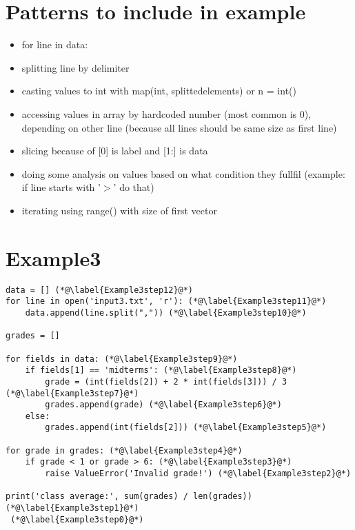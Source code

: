 \documentclass[11pt]{article}
\begin{document}
\section{Patterns to include in example}

\begin{itemize}

\item for line in data:

\item splitting line by delimiter

\item casting values to int with map(int, splittedelements) or n = int()

\item accessing values in array by hardcoded number (most common is 0), depending on other line (because all lines should be same size as first line)

\item slicing because of [0] is label and [1:] is data

\item doing some analysis on values based on what condition they fullfil (example: if line starts with '$>$' do that)

\item iterating using range() with size of first vector

\end{itemize}


\section{Example3}

\begin{lstlisting}
data = [] (*@\label{Example3step12}@*) 
for line in open('input3.txt', 'r'): (*@\label{Example3step11}@*) 
    data.append(line.split(",")) (*@\label{Example3step10}@*) 

grades = []

for fields in data: (*@\label{Example3step9}@*) 
    if fields[1] == 'midterms': (*@\label{Example3step8}@*) 
        grade = (int(fields[2]) + 2 * int(fields[3])) / 3 (*@\label{Example3step7}@*) 
        grades.append(grade) (*@\label{Example3step6}@*) 
    else:
        grades.append(int(fields[2])) (*@\label{Example3step5}@*) 

for grade in grades: (*@\label{Example3step4}@*) 
    if grade < 1 or grade > 6: (*@\label{Example3step3}@*) 
        raise ValueError('Invalid grade!') (*@\label{Example3step2}@*) 

print('class average:', sum(grades) / len(grades)) (*@\label{Example3step1}@*) 
 (*@\label{Example3step0}@*) 
\end{lstlisting}
\end{document}
